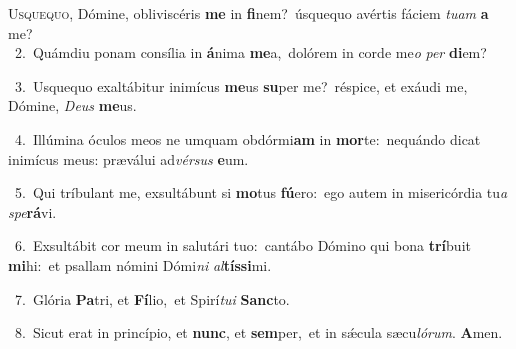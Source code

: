 \lettrine{\initial\textcolor{\initialcolor}{U}}{squequo,} Dómine, obliviscéris \textbf{me} in \textbf{fi}\-nem?~\star úsquequo avértis fáciem \textit{tu}\-\textit{am} \textbf{a} me?\\
{\numbfont\textcolor{\numbcolor}{~2.}}~Quámdiu ponam consília in \textbf{á}\-nima \textbf{me}\-a,~\star dolórem in corde me\textit{o} \textit{per} \textbf{di}\-em?\par
{\numbfont\textcolor{\numbcolor}{~3.}}~Usquequo exaltábitur inimícus \textbf{me}\-us \textbf{su}\-per me?~\star réspice, et exáudi me, Dómine, \textit{De}\-\textit{us} \textbf{me}\-us.\par
{\numbfont\textcolor{\numbcolor}{~4.}}~Illúmina óculos meos ne umquam obdórmi\textbf{am} in \textbf{mor}\-te:~\star nequándo dicat inimícus meus: præválui ad\-\textit{vér}\-\textit{sus} \textbf{e}\-um.\par
{\numbfont\textcolor{\numbcolor}{~5.}}~Qui tríbulant me, exsultábunt si \textbf{mo}\-tus \textbf{fú}\-ero:~\star ego autem in misericórdia tu\textit{a} \textit{spe}\-\textbf{rá}vi.\par
{\numbfont\textcolor{\numbcolor}{~6.}}~Exsultábit cor meum in salutári tuo:~\dagger cantábo Dómino qui bona \textbf{trí}\-buit \textbf{mi}\-hi:~\star et psallam nómini Dómi\textit{ni} \textit{al}\-\textbf{tís}\textbf{si}mi.\par
{\numbfont\textcolor{\numbcolor}{~7.}}~Glória \textbf{Pa}\-tri, et \textbf{Fí}\-lio,~\star et Spirí\-\textit{tu}\-\textit{i} \textbf{Sanc}\-to.\par
{\numbfont\textcolor{\numbcolor}{~8.}}~Sicut erat in princípio, et \textbf{nunc}\-, et \textbf{sem}\-per,~\star et in sǽcula sæcu\-\textit{ló}\-\textit{rum}. \textbf{A}\-men.\par
